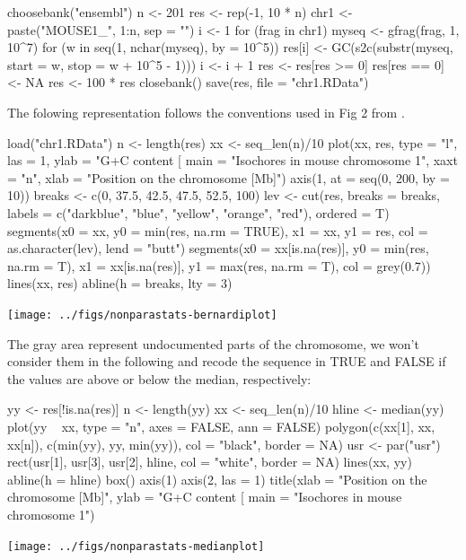 \documentclass{article}
\begin{document}
%
%
\begin{Schunk}
\begin{Sinput}
 choosebank("ensembl")
 n <- 201
 res <- rep(-1, 10 * n)
 chr1 <- paste("MOUSE1_", 1:n, sep = "")
 i <- 1
 for (frag in chr1) {
     myseq <- gfrag(frag, 1, 10^7)
     for (w in seq(1, nchar(myseq), by = 10^5)) {
         res[i] <- GC(s2c(substr(myseq, start = w, stop = w + 
             10^5 - 1)))
         i <- i + 1
     }
 }
 res <- res[res >= 0]
 res[res == 0] <- NA
 res <- 100 * res
 closebank()
 save(res, file = "chr1.RData")
\end{Sinput}
\end{Schunk}

The folowing representation follows the conventions used in Fig 2 from \cite{PacesJ2004}.

\begin{Schunk}
\begin{Sinput}
 load("chr1.RData")
 n <- length(res)
 xx <- seq_len(n)/10
 plot(xx, res, type = "l", las = 1, ylab = "G+C content [%
     main = "Isochores in mouse chromosome 1", xaxt = "n", 
     xlab = "Position on the chromosome [Mb]")
 axis(1, at = seq(0, 200, by = 10))
 breaks <- c(0, 37.5, 42.5, 47.5, 52.5, 100)
 lev <- cut(res, breaks = breaks, labels = c("darkblue", "blue", 
     "yellow", "orange", "red"), ordered = T)
 segments(x0 = xx, y0 = min(res, na.rm = TRUE), x1 = xx, y1 = res, 
     col = as.character(lev), lend = "butt")
 segments(x0 = xx[is.na(res)], y0 = min(res, na.rm = T), x1 = xx[is.na(res)], 
     y1 = max(res, na.rm = T), col = grey(0.7))
 lines(xx, res)
 abline(h = breaks, lty = 3)
\end{Sinput}
\end{Schunk}
\texttt{[image: ../figs/nonparastats-bernardiplot]}

The gray area represent undocumented parts of the chromosome, we won't
consider them in the following and recode the sequence in TRUE and FALSE
if the values are above or below the median, respectively:

\begin{Schunk}
\begin{Sinput}
 yy <- res[!is.na(res)]
 n <- length(yy)
 xx <- seq_len(n)/10
 hline <- median(yy)
 plot(yy ~ xx, type = "n", axes = FALSE, ann = FALSE)
 polygon(c(xx[1], xx, xx[n]), c(min(yy), yy, min(yy)), col = "black", 
     border = NA)
 usr <- par("usr")
 rect(usr[1], usr[3], usr[2], hline, col = "white", border = NA)
 lines(xx, yy)
 abline(h = hline)
 box()
 axis(1)
 axis(2, las = 1)
 title(xlab = "Position on the chromosome [Mb]", ylab = "G+C content [%
     main = "Isochores in mouse chromosome 1")
\end{Sinput}
\end{Schunk}
\texttt{[image: ../figs/nonparastats-medianplot]}
\end{document}
